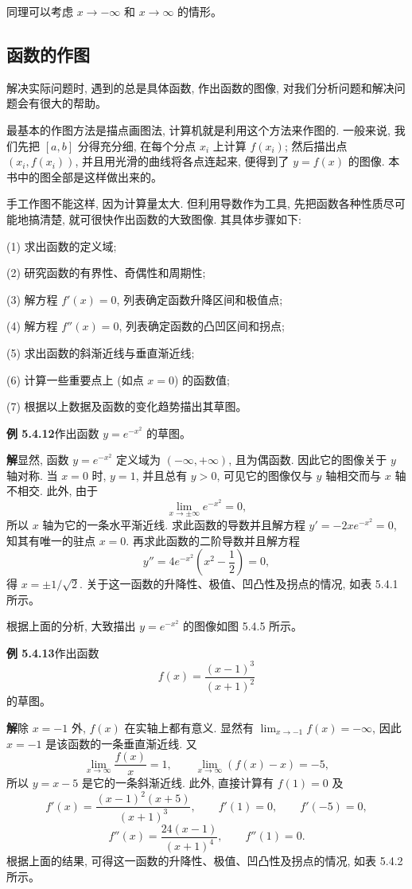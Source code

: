 \documentclass[UTF8,12pt,a4paper,fontset=fandol]{ctexart}
\begin{document}
同理可以考虑 $x\to-\infty$ 和 $x\to\infty$ 的情形。

\subsection{函数的作图}

解决实际问题时, 遇到的总是具体函数, 作出函数的图像, 对我们分析问题和解决问题会有很大的帮助。

最基本的作图方法是描点画图法, 计算机就是利用这个方法来作图的. 一般来说, 我们先把 $[a,b]$ 分得充分细, 在每个分点 $x_i$ 上计算 $f(x_i)$; 然后描出点 $(x_i,f(x_i))$, 并且用光滑的曲线将各点连起来, 便得到了 $y=f(x)$ 的图像. 本书中的图全部是这样做出来的。

手工作图不能这样, 因为计算量太大. 但利用导数作为工具, 先把函数各种性质尽可能地搞清楚, 就可很快作出函数的大致图像. 其具体步骤如下:

(1) 求出函数的定义域;

(2) 研究函数的有界性、奇偶性和周期性;

(3) 解方程 $f'(x)=0$, 列表确定函数升降区间和极值点;

(4) 解方程 $f''(x)=0$, 列表确定函数的凸凹区间和拐点;

(5) 求出函数的斜渐近线与垂直渐近线;

(6) 计算一些重要点上 (如点 $x=0$) 的函数值;

(7) 根据以上数据及函数的变化趋势描出其草图。

\noindent\textbf{例 5.4.12}\quad 作出函数 $y=e^{-x^2}$ 的草图。

\noindent\textbf{解}\quad 显然, 函数 $y=e^{-x^2}$ 定义域为 $(-\infty,+\infty)$, 且为偶函数. 因此它的图像关于 $y$ 轴对称. 当 $x=0$ 时, $y=1$, 并且总有 $y>0$, 可见它的图像仅与 $y$ 轴相交而与 $x$ 轴不相交. 此外, 由于
\[
  \lim_{x\to\pm\infty}e^{-x^2}=0,
\]
所以 $x$ 轴为它的一条水平渐近线. 求此函数的导数并且解方程 $y'=-2xe^{-x^2}=0$, 知其有唯一的驻点 $x=0$. 再求此函数的二阶导数并且解方程
\[
  y''=4e^{-x^2}\left(x^2-\frac12\right)=0,
\]
得 $x=\pm1/\sqrt2$. 关于这一函数的升降性、极值、凹凸性及拐点的情况, 如表 5.4.1 所示。

根据上面的分析, 大致描出 $y=e^{-x^2}$ 的图像如图 5.4.5 所示。

\noindent\textbf{例 5.4.13}\quad 作出函数
\[
  f(x)=\frac{(x-1)^3}{(x+1)^2}
\]
的草图。

\noindent\textbf{解}\quad 除 $x=-1$ 外, $f(x)$ 在实轴上都有意义. 显然有 $\lim_{x\to-1}f(x)=-\infty$, 因此 $x=-1$ 是该函数的一条垂直渐近线. 又
\[
  \lim_{x\to\infty}\frac{f(x)}x=1,\qquad
  \lim_{x\to\infty}(f(x)-x)=-5,
\]
所以 $y=x-5$ 是它的一条斜渐近线. 此外, 直接计算有 $f(1)=0$ 及
\[
  f'(x)=\frac{(x-1)^2(x+5)}{(x+1)^3},\qquad
  f'(1)=0,\qquad f'(-5)=0,
\]
\[
  f''(x)=\frac{24(x-1)}{(x+1)^4},\qquad f''(1)=0.
\]
根据上面的结果, 可得这一函数的升降性、极值、凹凸性及拐点的情况, 如表 5.4.2 所示。
\end{document}
